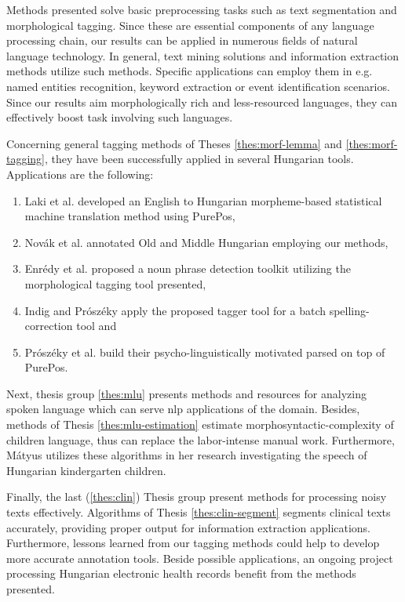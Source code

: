 
Methods presented solve basic preprocessing tasks such as text segmentation and morphological tagging. 
Since these are essential components of any language processing chain, our results can be applied in numerous fields of natural language technology. 
In general, text mining solutions and information extraction methods utilize such methods.
Specific applications can employ them  in e.g. named entities recognition, keyword extraction or event identification scenarios. 
Since our results aim morphologically rich and less-resourced languages, they can effectively boost task involving such languages.

Concerning general tagging methods of Theses \ref{thes:morf-lemma} and \ref{thes:morf-tagging}, they have been successfully applied in several Hungarian tools.
Applications are the following:
\begin{enumerate}
\item Laki et al. \cite{Laki2013} developed an English to Hungarian morpheme-based statistical machine translation method using PurePos,
\item Novák et al. \cite{Novak2013} annotated Old and Middle Hungarian employing our methods,
\item Enrédy et al. \cite{Endredy2014} proposed a noun phrase detection toolkit utilizing the morphological tagging tool presented,
\item Indig and Prószéky apply \cite{Indig2013} the proposed tagger tool for a batch spelling-correction tool and
\item Prószéky et al. \cite{Proszeky2014} build their psycho-linguistically motivated parsed on top of PurePos.
\end{enumerate}

Next, thesis group \ref{thes:mlu} presents methods and resources for analyzing spoken language which can serve \acrshort{nlp} applications of the domain.
Besides, methods of Thesis \ref{thes:mlu-estimation} estimate morphosyntactic-complexity of children language, thus can replace the labor-intense manual work.
Furthermore, Mátyus utilizes \cite{Matyus2014b} these algorithms in her research investigating the speech of Hungarian kindergarten children.

Finally, the last (\ref{thes:clin}) Thesis group present methods for processing noisy texts effectively.
Algorithms of Thesis \ref{thes:clin-segment} segments clinical texts accurately, providing proper output for information extraction applications. 
Furthermore, lessons learned from our tagging methods could help to develop more accurate annotation tools.
Beside possible applications, an ongoing project \cite{Siklosi2014,Siklosi2014mszny} processing Hungarian electronic health records benefit from the methods presented.


